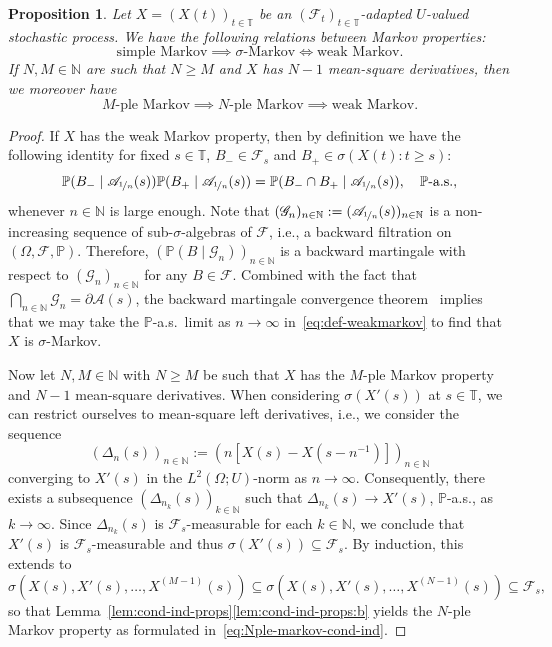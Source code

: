 \documentclass[reqno]{amsart}
\numberwithin{equation}{section}
\newcommand{\bbP}{\mathbb{P}}
\newcommand{\bbT}{\mathbb{T}}
\newcommand{\N}{\mathbb{N}}
\newcommand{\cF}{\mathcal{F}}
\newtheorem{proposition}[lemma]{Proposition}
\theoremstyle{remark}
\theoremstyle{definition}
\begin{document}
\begin{proposition}\label{prop:Markov-relations}
	Let $X = (X(t))_{t\in\bbT}$ be an $(\cF_t)_{t\in\bbT}$-adapted $U$-valued stochastic process.
	We have the following
	relations between Markov properties:
	\[
	\text{simple Markov} \implies  \text{$\sigma$-Markov} \iff \text{weak Markov}.
	\]
	If $N, M \in \N$ are such that $N \ge M$ and
	$X$ has $N - 1$ mean-square derivatives, then we moreover have
	\[
	\text{$M$-ple Markov} \implies \text{$N$-ple Markov} \implies \text{weak Markov}.
	\]
\end{proposition}
%
\begin{proof}
	If $X$ has the weak Markov property, then by definition
	we have the following identity for fixed $s \in \bbT$, $B_- \in \cF_s$ and $B_+ \in \sigma(X(t) : t \ge s)$:
	\begin{equation}\label{eq:def-weakmarkov}
		\bbP(B_- \mid \mathscr A_{\nicefrac{1}{n}}(s)) \bbP(B_+ \mid \mathscr A_{\nicefrac{1}{n}}(s)) 
		=
		\bbP(B_- \cap B_+ \mid \mathscr A_{\nicefrac{1}{n}}(s)),
		\quad \bbP\text{-a.s.},
	\end{equation}
	whenever $n \in \N$ is large enough.
	Note that $(\mathscr G_n)_{n\in\N} := (\mathscr A_{\nicefrac{1}{n}}(s))_{n\in\N}$ is 
	a non-increasing sequence of
	sub-$\sigma$-algebras of $\cF$, i.e., a backward filtration on $(\Omega, \cF, \bbP)$.
	Therefore, $(\bbP(B \mid \mathscr G_n))_{n\in\N}$ is a backward martingale with respect to
	$(\mathscr G_n)_{n\in\N}$ for any $B \in \cF$.
	Combined with the fact that $\bigcap_{n \in \N} \mathscr G_n = \partial \mathscr A(s)$,
	the backward martingale convergence theorem~\cite[Section~{12.7}, Theorem~4]{GrimmettStirzaker2001} implies that we may take
	the $\bbP$-a.s.\ limit as $n \to \infty$ in~\eqref{eq:def-weakmarkov} to find that $X$ is $\sigma$-Markov.
	
	Now let $N, M \in \N$ with $N \ge M$
	be such that $X$ has the $M$-ple Markov
	property and $N - 1$ mean-square derivatives.
	When considering $\sigma(X'(s))$ at $s \in \bbT$,
	we can restrict ourselves to mean-square left derivatives, i.e.,
	we consider the sequence
	\begin{equation}\label{eq:difference-quotients}
		(\Delta_n(s))_{n\in\N} := (n[X(s) - X(s-n^{-1})])_{n\in\N}
	\end{equation}
	converging to $X'(s)$ in the $L^2(\Omega; U)$-norm as $n \to \infty$.
	Consequently, there exists a subsequence $(\Delta_{n_k}(s))_{k\in\N}$ such that
	$\Delta_{n_k}(s) \to X'(s)$, $\bbP$-a.s., as $k \to \infty$.
	Since $\Delta_{n_k}(s)$ is $\cF_s$-measurable for each $k \in \N$, we conclude that
	$X'(s)$ is $\cF_s$-measurable and thus
	$\sigma(X'(s)) \subseteq \cF_s$. By induction, this extends to
	\[
	\sigma(X(s), X'(s), \dots, X^{(M-1)}(s)) \subseteq \sigma(X(s), X'(s), \dots, X^{(N-1)}(s)) \subseteq \cF_s,
	\]
	so that Lemma~\ref{lem:cond-ind-props}\ref{lem:cond-ind-props:b} yields the $N$-ple 
	Markov property as formulated in~\eqref{eq:Nple-markov-cond-ind}.
	

\end{proof}
\end{document}
